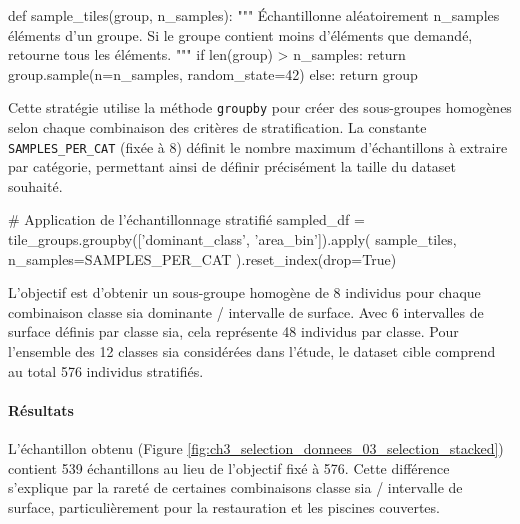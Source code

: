 \begin{code}[H]
    \begin{pythoncode}
    def sample_tiles(group, n_samples):
        """
        Échantillonne aléatoirement n_samples éléments d'un groupe.
        Si le groupe contient moins d'éléments que demandé, retourne tous les éléments.
        """
        if len(group) > n_samples:
            return group.sample(n=n_samples, random_state=42)
        else:
            return group
    \end{pythoncode}
    \label{code:echantillonnage_tuiles}
\end{code}

Cette stratégie utilise la méthode \texttt{groupby} pour créer des sous-groupes homogènes selon chaque combinaison des critères de stratification. La constante \texttt{SAMPLES\_PER\_CAT} (fixée à 8) définit le nombre maximum d'échantillons à extraire par catégorie, permettant ainsi de définir précisément la taille du dataset souhaité.

\begin{code}[H]
    \begin{pythoncode}
    # Application de l'échantillonnage stratifié
    sampled_df = tile_groups.groupby(['dominant_class', 'area_bin']).apply(
        sample_tiles, n_samples=SAMPLES_PER_CAT
    ).reset_index(drop=True)
    \end{pythoncode}
    \label{code:application_echantillonnage}
\end{code}

L'objectif est d'obtenir un sous-groupe homogène de 8 individus pour chaque combinaison classe \gls{sia} dominante / intervalle de surface. Avec 6 intervalles de surface définis par classe \gls{sia}, cela représente 48 individus par classe. Pour l'ensemble des 12 classes \gls{sia} considérées dans l'étude, le dataset cible comprend au total 576 individus stratifiés.

\paragraph{Résultats}
L'échantillon obtenu (Figure \ref{fig:ch3_selection_donnees_03_selection_stacked}) contient 539 échantillons au lieu de l'objectif fixé à 576. Cette différence s'explique par la rareté de certaines combinaisons classe \gls{sia} / intervalle de surface, particulièrement pour la restauration et les piscines couvertes.

